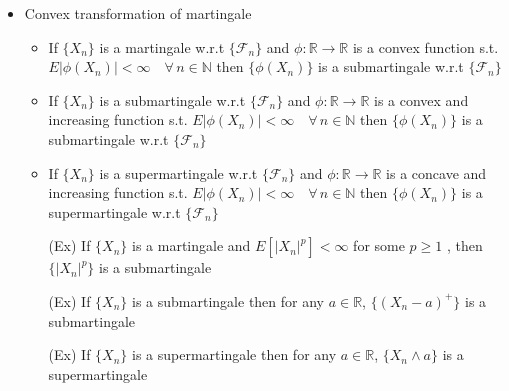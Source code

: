 \documentclass[12pt, A4]{article}
\newcommand{\N}{\mathbb{N}}
\newcommand{\R}{\mathbb{R}}
\newcommand{\F}{\mathcal{F}}
\newcommand{\foranyn}{\quad \forall \, n\in \N}
\begin{document}
\begin{itemize}
	\item Convex transformation of martingale
	\begin{itemize}
		\item If $\{X_n\}$ is a martingale w.r.t $\{\F_n\}$ and $\phi:\R\rightarrow \R$ is a convex function s.t. \\$E|\phi(X_n)|<\infty\foranyn$ then $\{\phi(X_n)\}$ is a submartingale w.r.t $\{\F_n\}$
		\item If $\{X_n\}$ is a submartingale w.r.t $\{\F_n\}$ and $\phi:\R\rightarrow \R$ is a convex and increasing function s.t. $E|\phi(X_n)|<\infty\foranyn$ then $\{\phi(X_n)\}$ is a submartingale w.r.t $\{\F_n\}$
		\item If $\{X_n\}$ is a supermartingale w.r.t $\{\F_n\}$ and $\phi:\R\rightarrow \R$ is a concave and increasing function s.t. $E|\phi(X_n)|<\infty\foranyn$ then $\{\phi(X_n)\}$ is a supermartingale w.r.t $\{\F_n\}$
		\item[(Ex)] If $\{X_n\}$ is a martingale and $E[|X_n|^p]<\infty$ for some $p\geq1$ , then $\{|X_n|^p\}$ is a submartingale
		\item[(Ex)] If $\{X_n\}$ is a submartingale then for any $a\in \R$, $\{(X_n-a)^+\}$ is a submartingale 
		\item[(Ex)] If $\{X_n\}$ is a supermartingale then for any $a\in \R$, $\{X_n\wedge a\}$ is a supermartingale 
	\end{itemize}


\end{itemize}
\end{document}
